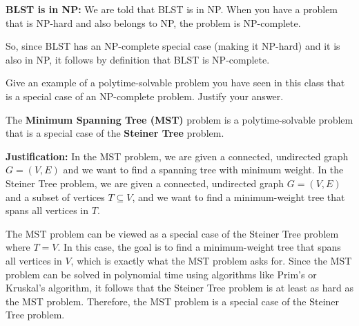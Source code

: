 \documentclass[11pt,fleqn]{exam}
\newenvironment{soln}{\color{solnblue}}{}
\newif\ifsolutions\solutionsfalse
\begin{document}
\begin{questions}
\begin{soln}
\textbf{BLST is in NP: }We are told that BLST is in NP.
When you have a problem that is NP-hard and also belongs to NP, 
the problem is NP-complete.

So, since BLST has an NP-complete special case (making it NP-hard) 
and it is also in NP, it follows by definition that BLST is NP-complete.
\end{soln}

\ifsolutions\fi

\question[4] Give an example of a polytime-solvable problem you have seen in this class that is a special case of an NP-complete problem. Justify your answer.

\begin{soln}
      The \textbf{Minimum Spanning Tree (MST)} problem is a polytime-solvable 
      problem that is a special case of the \textbf{Steiner Tree} problem. 

      \textbf{Justification: }In the MST problem, we are given a connected,
       undirected graph $G = (V, E)$ and we want to find a spanning tree with 
       minimum weight. 
      In the Steiner Tree problem, we are given a connected, undirected graph 
      $G = (V, E)$ and a subset of vertices $T \subseteq V$, and we want to 
      find a minimum-weight tree that spans all vertices in $T$.

      The MST problem can be viewed as a special case of the Steiner Tree 
      problem where $T = V$. In this case, the goal is to find a minimum-weight 
      tree that spans all vertices in $V$, which is exactly what the MST problem 
      asks for. Since the MST problem can be solved in polynomial time using 
      algorithms like Prim's or Kruskal's algorithm, it follows that the Steiner Tree 
      problem is at least as hard as the MST problem.
      Therefore, the MST problem is a special case of the Steiner Tree problem.
\end{soln}


\ifsolutions\fi

\end{questions}
\end{document}
